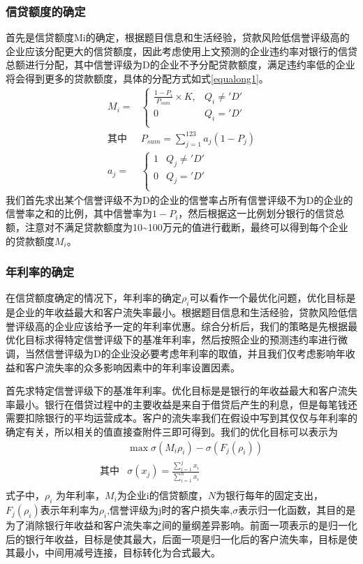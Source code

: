 \documentclass{cumcmthesis}
\begin{document}
\subsubsection{信贷额度的确定}
首先是信贷额度Mi的确定，根据题目信息和生活经验，贷款风险低信誉评级高的企业应该分配更大的信贷额度，因此考虑使用上文预测的企业违约率对银行的信贷总额进行分配，其中信誉评级为D的企业不予分配贷款额度，满足违约率低的企业将会得到更多的贷款额度，具体的分配方式如式\ref{equalong1}。
\begin{equation}
\begin{split}
M_i=&
\begin{cases}
\frac{1-P_i}{P_{sum}}\times K, & Q_i \ne 'D'\\
0 & Q_i = 'D' \\
\end{cases} \\
\mbox{其中} &  P_{sum} = \sum_{j=1}^{123} a_j (1-P_j) \\
 a_j =& 
\begin{cases}
1 & Q_j \ne 'D' \\
0 & Q_j = 'D'\\
\end{cases}
\end{split}
\label{equalong1}
\end{equation}
我们首先求出某个信誉评级不为D的企业的信誉率占所有信誉评级不为D的企业的信誉率之和的比例，其中信誉率为$1-P_i$，然后根据这一比例划分银行的信贷总额，注意对不满足贷款额度为10\textasciitilde 100万元的值进行截断，最终可以得到每个企业的贷款额度$M_i$。
\subsubsection{年利率的确定}
在信贷额度确定的情况下，年利率的确定$\rho_i$可以看作一个最优化问题，优化目标是是企业的年收益最大和客户流失率最小。根据题目信息和生活经验，贷款风险低信誉评级高的企业应该给予一定的年利率优惠。综合分析后，我们的策略是先根据最优化目标求得特定信誉评级下的基准年利率，然后按照企业的预测违约率进行微调，当然信誉评级为D的企业没必要考虑年利率的取值，并且我们仅考虑影响年收益和客户流失率的众多影响因素中的年利率设置因素。


首先求特定信誉评级下的基准年利率。优化目标是是银行的年收益最大和客户流失率最小。银行在借贷过程中的主要收益是来自于借贷后产生的利息，但是每笔钱还需要扣除银行的平均运营成本。客户的流失率我们在假设中写到其仅仅与年利率的确定有关，所以相关的值直接查附件三即可得到。我们的优化目标可以表示为
\begin{equation}
    \begin{split}
    & \max \sigma(M_i \rho_i) - \sigma(F_j(\rho_i))
    \\
    \mbox{其中} &  \sigma(x_j) = \frac{\sum_{i=1}^{j}x_i}{\sum_{i=1}^{n}x_i} \\
    \end{split}
    \label{equalong2}
\end{equation}
式子中，$\rho_i$ 为年利率，$M_i$为企业i的信贷额度，$N$为银行每年的固定支出，
$F_j(\rho_i)$表示年利率为$\rho_i$,信誉评级为j时的客户损失率,$\sigma$表示归一化函数，其目的是为了消除银行年收益和客户流失率之间的量纲差异影响。前面一项表示的是归一化后的银行年收益，目标是使其最大，后面一项是归一化后的客户流失率，目标是使其最小，中间用减号连接，目标转化为合式最大。
\end{document}
